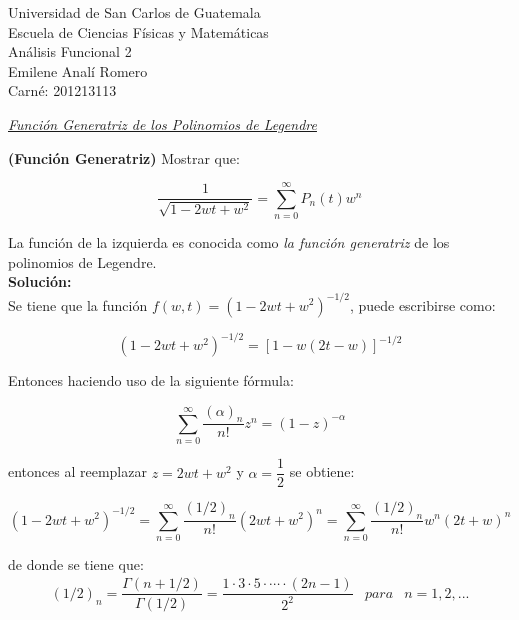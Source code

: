 \documentclass{article}
\begin{document}
\begin{flushleft}
	Universidad de San Carlos de Guatemala\\
	Escuela de Ciencias Físicas y Matemáticas\\
	Análisis Funcional 2\\
	Emilene Analí Romero\\
	Carné: 201213113
\end{flushleft}

\begin{center}
	\textit{\underline{Función Generatriz de los Polinomios de Legendre}}
\end{center}
	
\textbf{(Función Generatriz)} Mostrar que:

\begin{equation*} %
\dfrac{1}{\sqrt{1-2wt+w^{2}}}=\sum\limits_{n=0}^\infty P_{n}(t)w^{n}
\end{equation*}

La función de la izquierda es conocida como \textit{la función generatriz} de los polinomios de Legendre.\\
	
\textbf{Solución:}\\
	
Se tiene que la función $f(w,t)=(1-2wt+w^{2})^{-1/2}$, puede escribirse como:
	
\begin{equation*} %
(1-2wt+w^{2})^{-1/2}=[1-w(2t-w)]^{-1/2}
\end{equation*}
	
Entonces haciendo uso de la siguiente fórmula: 
	
\begin{equation*} %
\sum\limits_{n=0}^\infty\dfrac{(\alpha)_{n}}{n!}z^{n}=(1-z)^{-\alpha}
\end{equation*}

entonces al reemplazar $z=2wt+w^{2}$ y $\alpha=\dfrac{1}{2}$ se obtiene:

\begin{equation*}
(1-2wt+w^{2})^{-1/2}=\sum\limits_{n=0}^\infty\dfrac{(1/2)_{n}}{n!}(2wt+w^{2})^{n}=\sum\limits_{n=0}^\infty\dfrac{(1/2)_{n}}{n!}w^{n}(2t+w)^{n}
\end{equation*}	

de donde se tiene que:\\

\begin{equation*}
\begin{array}{lll}
(1/2)_{n}=\dfrac{\Gamma(n+1/2)}{\Gamma(1/2)}=\dfrac{1\cdot3\cdot5\cdot\cdots\cdot(2n-1)}{2^{2}} &para &n=1,2,...
\end{array}
\end{equation*}
\end{document}
